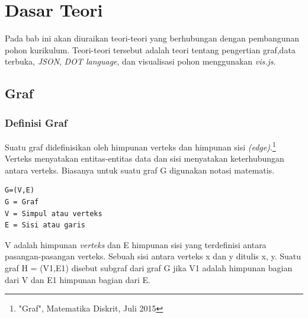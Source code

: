 
\chapter{Dasar Teori}
\label{chap:Dasar Teori}
Pada bab ini akan diuraikan teori-teori yang berhubungan dengan pembangunan pohon kurikulum. Teori-teori tersebut adalah teori tentang pengertian graf,data terbuka, \textit{JSON}, \textit{DOT language}, dan visualisasi pohon menggunakan \textit{vis.js}.

\section{Graf}
\label{sec: Graf}

\subsection{Definisi Graf}
\label{sec: Definisi Graf}
Suatu graf didefinisikan oleh himpunan verteks dan himpunan sisi \textit{(edge)}.\footnote{"Graf", Matematika Diskrit, Juli 2015}
Verteks menyatakan entitas-entitas data dan sisi menyatakan keterhubungan antara
verteks. Biasanya untuk suatu graf G digunakan notasi matematis. 
\begin{lstlisting}
G=(V,E)
G = Graf
V = Simpul atau verteks
E = Sisi atau garis
\end{lstlisting}

V adalah himpunan \textit{verteks} dan E himpunan sisi yang terdefinisi antara pasangan-pasangan verteks. Sebuah sisi antara verteks x dan y ditulis {x, y}. Suatu graf H = (V1,E1) disebut subgraf dari graf G jika V1 adalah himpunan bagian dari V dan E1 himpunan bagian dari E.
